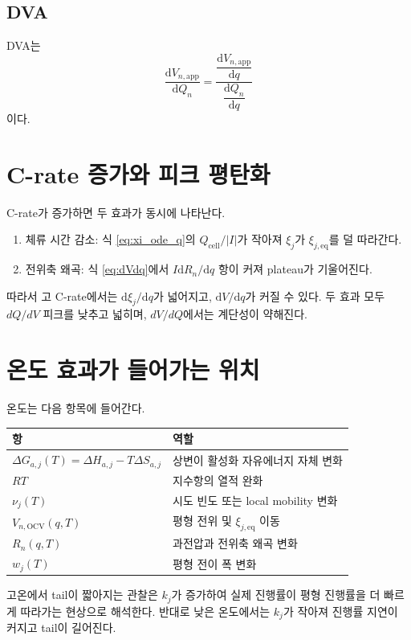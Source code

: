 \documentclass[11pt,a4paper]{article}
\newcommand{\dd}{\mathrm{d}}
\newcommand{\OCV}{\mathrm{OCV}}
\newcommand{\app}{\mathrm{app}}
\newcommand{\eq}{\mathrm{eq}}
\newcommand{\cell}{\mathrm{cell}}
\begin{document}
\subsection{DVA}
DVA는
\begin{equation}
\boxed{
\frac{\dd V_{n,\app}}{\dd Q_n}=\frac{\dfrac{\dd V_{n,\app}}{\dd q}}{\dfrac{\dd Q_n}{\dd q}}
}
\label{eq:DVA_param}
\end{equation}
이다.

\section{C-rate 증가와 피크 평탄화}
C-rate가 증가하면 두 효과가 동시에 나타난다.

\begin{enumerate}[label=\arabic*)]
\item 체류 시간 감소: 식 \eqref{eq:xi_ode_q}의 \(Q_{\cell}/|I|\)가 작아져 \(\xi_j\)가 \(\xi_{j,\eq}\)를 덜 따라간다.
\item 전위축 왜곡: 식 \eqref{eq:dVdq}에서 \(I\dd R_n/\dd q\) 항이 커져 plateau가 기울어진다.
\end{enumerate}

따라서 고 C-rate에서는 \(\dd\xi_j/\dd q\)가 넓어지고, \(\dd V/\dd q\)가 커질 수 있다. 두 효과 모두 \(dQ/dV\) 피크를 낮추고 넓히며, \(dV/dQ\)에서는 계단성이 약해진다.

\section{온도 효과가 들어가는 위치}
온도는 다음 항목에 들어간다.

\begin{longtable}{p{}p{}}
\toprule
항 & 역할 \\
\midrule
\endhead
\(\Delta G_{a,j}(T)=\Delta H_{a,j}-T\Delta S_{a,j}\) & 상변이 활성화 자유에너지 자체 변화 \\
\(RT\) & 지수항의 열적 완화 \\
\(\nu_j(T)\) & 시도 빈도 또는 local mobility 변화 \\
\(V_{n,\OCV}(q,T)\) & 평형 전위 및 \(\xi_{j,\eq}\) 이동 \\
\(R_n(q,T)\) & 과전압과 전위축 왜곡 변화 \\
\(w_j(T)\) & 평형 전이 폭 변화 \\
\bottomrule
\end{longtable}

고온에서 tail이 짧아지는 관찰은 \(k_j\)가 증가하여 실제 진행률이 평형 진행률을 더 빠르게 따라가는 현상으로 해석한다. 반대로 낮은 온도에서는 \(k_j\)가 작아져 진행률 지연이 커지고 tail이 길어진다.
\end{document}
